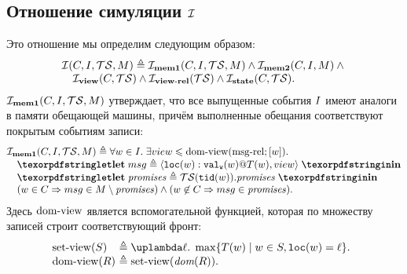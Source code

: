   \subsection{Отношение симуляции $\mathcal{I}$}
  Это отношение мы определим следующим образом:
  \[\inarr{
    \simRel(C, \IssuedSet, \TSf, M) \defeq \invMemOne(C, \IssuedSet, \TSf, M) \land  \invMemTwo(C, \IssuedSet, M) \land {} \\
    \quad \invView(C, \TSf) \land \invViewRel(\TSf) \land \invState(C, \TSf).
  }\]
  $\mathcal{I}_{\rm \bf mem1}(C, I, \mathcal{TS}, M)$ утверждает, что все выпущенные
  события $I$ имеют аналоги в памяти обещающей машины, причём выполненные обещания соответствуют покрытым
  событиям записи:
  \[\inarr{
  \invMemOne(C, \IssuedSet, \TSf, M) \defeq \forall w \in \IssuedSet. \; \exists \view \le \domView(\msgRel; [w]). \; \\
  \quad \letdef{msg}{\msg{\lLOC(w)}{\lVALW(w)}{T(w)}{\view}} \\
  \quad \letdef{\PromSet}{\TSf(\lTID(w)).\PromSet} \\
  \quad (w \in  C \implies msg \in M \setminus \PromSet) \land (w \nin C \implies msg \in \PromSet). \\
  }\]
  Здесь ${\rm dom\text{-}view}$ является вспомогательной функцией, которая по множеству записей строит соответствующий фронт:
  \[\begin{array}{@{}l@{~}l}
    \setView(S) & \defeq \lambda \loc. \; \max \{ T(w) \mid w \in S, \lLOC(w) = \loc\}. \\
    \domView(R) & \defeq \setView(\dom{R}). \\
  \end{array}\]
  
